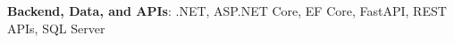 \item{\textbf{Backend, Data, and APIs}{: .NET, ASP.NET Core, EF Core, FastAPI, REST APIs, SQL Server}}
